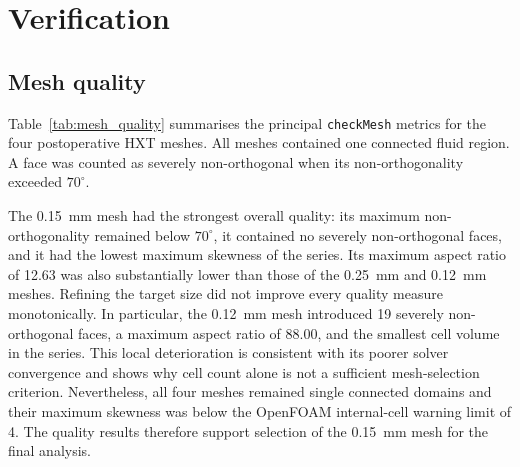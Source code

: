 \documentclass[11pt,a4paper]{article}
\begin{document}
\section{Verification}
\label{sec:verification}

\subsection{Mesh quality}

Table~\ref{tab:mesh_quality} summarises the principal \texttt{checkMesh}
metrics for the four postoperative HXT meshes. All meshes contained one
connected fluid region. A face was counted as severely non-orthogonal when its
non-orthogonality exceeded $70^\circ$.

\begin{table}[htbp]
  \centering
  \caption{Postoperative HXT mesh-quality metrics reported by
  \texttt{checkMesh}. The minimum cell volumes are given after conversion of
  the geometry from millimetres to metres.}
  \label{tab:mesh_quality}
\end{table}

The \SI{0.15}{\milli\metre} mesh had the strongest overall quality: its maximum
non-orthogonality remained below $70^\circ$, it contained no severely
non-orthogonal faces, and it had the lowest maximum skewness of the series. Its
maximum aspect ratio of 12.63 was also substantially lower than those of the
\SI{0.25}{\milli\metre} and \SI{0.12}{\milli\metre} meshes. Refining the target
size did not improve every quality measure monotonically. In particular, the
\SI{0.12}{\milli\metre} mesh introduced 19 severely non-orthogonal faces, a
maximum aspect ratio of 88.00, and the smallest cell volume in the series. This
local deterioration is consistent with its poorer solver convergence and shows
why cell count alone is not a sufficient mesh-selection criterion. Nevertheless,
all four meshes remained single connected domains and their maximum skewness was
below the OpenFOAM internal-cell warning limit of 4. The quality results therefore
support selection of the \SI{0.15}{\milli\metre} mesh for the final analysis.
\end{document}
